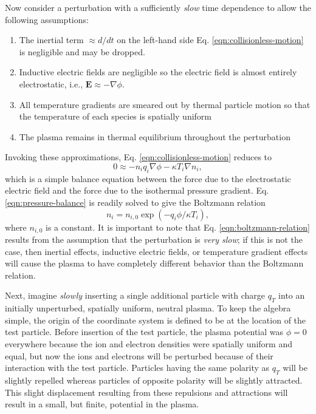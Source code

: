 Now consider a perturbation with a sufficiently \textit{slow} time dependence to allow the following assumptions:
\begin{enumerate}
    \item The inertial term $\approx d/dt$ on the left-hand side Eq. \eqref{eqn:collisionless-motion} is negligible and may be dropped.
    \item Inductive electric fields are negligible so the electric field is almost entirely electrostatic, i.e., $\boldsymbol{E} \approx - \nabla \phi$.
    \item All temperature gradients are smeared out by thermal particle motion so that the temperature of each species is spatially uniform
    \item The plasma remains in thermal equilibrium throughout the perturbation
\end{enumerate}
Invoking these approximations, Eq. \eqref{eqn:collisionless-motion} reduces to
\begin{equation} \label{eqn:pressure-balance}
    0 \approx -n_i q_i \nabla \phi - \kappa T_i \nabla n_i,
\end{equation}
which is a simple balance equation between the force due to the electrostatic electric field and the force due to the isothermal pressure gradient. Eq. \eqref{eqn:pressure-balance} is readily solved to give the Boltzmann relation
\begin{equation} \label{eqn:boltzmann-relation}
    n_i = n_{i,0} \exp\left(-q_i \phi / \kappa T_i\right),
\end{equation}
where $n_{i,0}$ is a constant. It is important to note that Eq. \eqref{eqn:boltzmann-relation} results from the assumption that the perturbation is \textit{very slow}; if this is not the case, then inertial effects, inductive electric fields, or temperature gradient effects will cause the plasma to have completely different behavior than the Boltzmann relation.

Next, imagine \textit{slowly} inserting a single additional particle with charge $q_T$ into an initially unperturbed, spatially uniform, neutral plasma. To keep the algebra simple, the origin of the coordinate system is defined to be at the location of the test particle. Before insertion of the test particle, the plasma potential was $\phi = 0$ everywhere because the ion and electron densities were spatially uniform and equal, but now the ions and electrons will be perturbed because of their interaction with the test particle. Particles having the same polarity as $q_T$ will be slightly repelled whereas particles of opposite polarity will be slightly attracted. This slight displacement resulting from these repulsions and attractions will result in a small, but finite, potential in the plasma.

